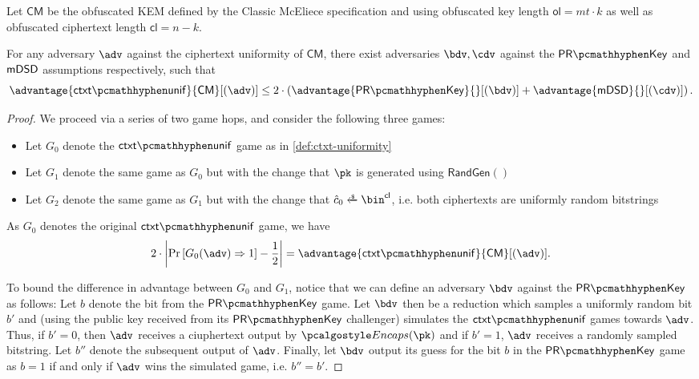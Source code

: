 \begin{lemma}
\label{lem:classic-mceliece-ctxt-unif}
    Let $\mathsf{CM}$ be the obfuscated KEM defined by the Classic McEliece specification \cite{NISTPQC-R4:ClassicMcEliece22} and using obfuscated key length $\mathsf{ol} = mt \cdot k$ as well as obfuscated ciphertext length $\mathsf{cl} = n-k$.
    
    For any adversary $\adv$ against the ciphertext uniformity of $\mathsf{CM}$, there exist adversaries $\bdv, \cdv$ against the $\prkey$ and $\mathsf{mDSD}$ assumptions respectively, such that
    \[
        \advantage{\ctxtunif}{\mathsf{CM}}[(\adv)]
        \leq 2 \cdot \left(
            \advantage{\prkey}{}[(\bdv)] + \advantage{\mdsd}{}[(\cdv)]
        \right).
    \]
\end{lemma}
\begin{proof}
    We proceed via a series of two game hops, and consider the following three games:
    \begin{itemize}
        \item Let $G_0$ denote the $\ctxtunif$ game as in \cref{def:ctxt-uniformity}
        \item Let $G_1$ denote the same game as $G_0$ but with the change that $\pk$ is generated using $\textsf{RandGen}()$
        \item Let $G_2$ denote the same game as $G_1$ but with the change that $\hat c_0 \getsr \bin^\mathsf{cl}$, i.e. both ciphertexts are uniformly random bitstrings
    \end{itemize}

    As $G_0$ denotes the original $\ctxtunif$ game, we have
    \[
        2 \cdot \left|
            \Pr\left[G_0(\adv) \Rightarrow 1\right] - \frac{1}{2}
        \right|
        = \advantage{\ctxtunif}{\mathsf{CM}}[(\adv)].
    \]

    To bound the difference in advantage between $G_0$ and $G_1$, notice that we can define an adversary $\bdv$ against the $\prkey$ as follows:
    Let $b$ denote the bit from the $\prkey$ game. Let $\bdv$ then be a reduction which samples a uniformly random bit $b'$ and (using the public key received from its $\prkey$ challenger) simulates the $\ctxtunif$ games towards $\adv$. Thus, if $b'=0$, then $\adv$ receives a ciuphertext output by $\encaps(\pk)$ and if $b'=1$, $\adv$ receives a randomly sampled bitstring.
    Let $b''$ denote the subsequent output of $\adv$.
    Finally, let $\bdv$ output its guess for the bit $b$ in the $\prkey$ game as $b=1$ if and only if $\adv$ wins the simulated game, i.e. $b'' = b'$.


\end{proof}
